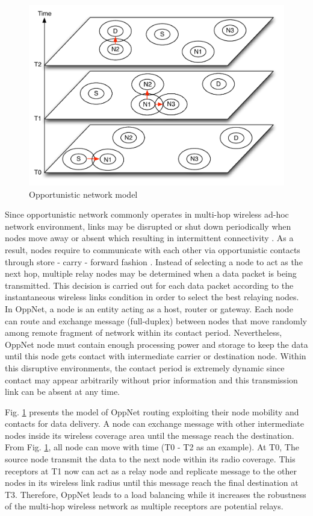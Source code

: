 \begin{figure}[!t]
\centering
\includegraphics[width=5in]{Figures/OpportunisticNetworkNodel.pdf}
\caption{Opportunistic network model}
\label{Opportunistic network model}
\end{figure}

Since opportunistic network commonly operates in multi-hop wireless ad-hoc network environment, links may be disrupted or shut down periodically when nodes move away or absent which resulting in intermittent connectivity \cite{Moreira2011}. As a result, nodes require to communicate with each other via opportunistic contacts through store - carry - forward fashion \cite{Chung-Ming2008}. Instead of selecting a node to act as the next hop, multiple relay nodes may be determined when a data packet is being transmitted. This decision is carried out for each data packet according to the instantaneous wireless links condition in order to select the best relaying nodes. In OppNet, a node is an entity acting as a host, router or gateway. Each node can route and exchange message (full-duplex) between nodes that move randomly among remote fragment of network within its contact period. Nevertheless, OppNet node must contain enough processing power and storage to keep the data until this node gets contact with intermediate carrier or destination node. Within this disruptive environments, the contact period is extremely dynamic since contact may appear arbitrarily without prior information and this transmission link can be absent at any time.

Fig. \ref{Opportunistic network model} presents the model of OppNet routing exploiting their node mobility and contacts for data delivery. A node can exchange message with other intermediate nodes inside its wireless coverage area until the message reach the destination. From Fig. \ref{Opportunistic network model}, all node can move with time (T0 - T2 as an example). At T0, The source node transmit the data to the next node within its radio coverage. This receptors at T1 now can act as a relay node and replicate message to the other nodes in its wireless link radius until this message reach the final destination at T3. Therefore, OppNet leads to a load balancing while it increases the robustness of the multi-hop wireless network as multiple receptors are potential relays.


